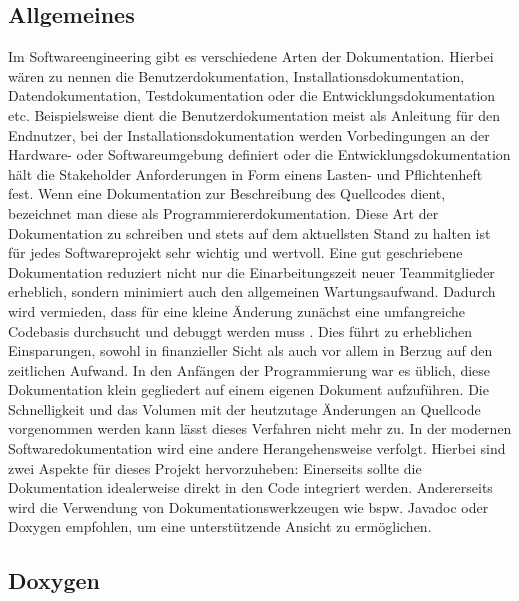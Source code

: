 \documentclass[11pt,a4paper]{report}
\begin{document}
\subsection{Allgemeines}
Im Softwareengineering gibt es verschiedene Arten der Dokumentation. Hierbei wären zu nennen die 
Benutzerdokumentation, Installationsdokumentation, Datendokumentation, Testdokumentation oder die 
Entwicklungsdokumentation etc.\cite{Beningo} Beispielsweise dient die Benutzerdokumentation meist als Anleitung für den Endnutzer, bei der Installationsdokumentation werden Vorbedingungen an der Hardware- oder Softwareumgebung definiert oder die Entwicklungsdokumentation hält die Stakeholder Anforderungen in Form einens Lasten- und Pflichtenheft fest\cite{Lehner}. Wenn eine Dokumentation zur Beschreibung des Quellcodes dient, bezeichnet man diese als Programmiererdokumentation. Diese Art der Dokumentation zu schreiben und stets auf dem aktuellsten Stand zu halten ist für jedes Softwareprojekt sehr wichtig und wertvoll. Eine gut geschriebene Dokumentation reduziert nicht nur die Einarbeitungszeit neuer Teammitglieder erheblich, sondern minimiert auch den allgemeinen Wartungsaufwand. Dadurch wird vermieden, dass für eine kleine Änderung zunächst eine umfangreiche Codebasis durchsucht und debuggt werden muss \cite{Beningo}. Dies führt zu erheblichen Einsparungen, sowohl in finanzieller Sicht als auch vor allem in Berzug auf den zeitlichen Aufwand.\cite{Lehner} In den Anfängen der Programmierung war es üblich, diese Dokumentation klein gegliedert auf einem eigenen Dokument aufzuführen.\cite{Lehner} Die Schnelligkeit und das Volumen mit der heutzutage Änderungen an Quellcode vorgenommen werden kann lässt dieses Verfahren nicht mehr zu. In der modernen Softwaredokumentation wird eine andere Herangehensweise verfolgt. Hierbei sind zwei Aspekte für dieses Projekt hervorzuheben: Einerseits sollte die Dokumentation idealerweise direkt in den Code integriert werden. Andererseits wird die Verwendung von Dokumentationswerkzeugen wie bspw. Javadoc oder Doxygen empfohlen, um eine unterstützende Ansicht zu ermöglichen\cite{Lehner}. 

\subsection{Doxygen} \label{sub:Doxygen}
\end{document}
